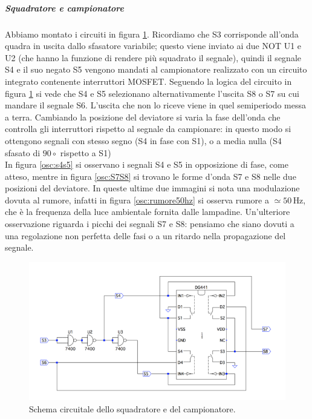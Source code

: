 \documentclass[10pt,a4paper]{article}
\begin{document}
\subparagraph{Squadratore e campionatore}
Abbiamo montato i circuiti in figura \ref{fig:sqadratore-campionatore}. Ricordiamo che S3 corrisponde all'onda quadra in uscita dallo sfasatore variabile; questo viene inviato ai due NOT U1 e U2 (che hanno la funzione di rendere più squadrato il segnale), quindi il segnale S4 e il suo negato S5 vengono mandati al campionatore realizzato con un circuito integrato contenente interruttori MOSFET. Seguendo la logica del circuito in figura \ref{fig:sqadratore-campionatore} si vede che S4 e S5 selezionano alternativamente l'uscita S8 o S7 su cui mandare il segnale S6. L'uscita che non lo riceve viene in quel semiperiodo messa a terra.
Cambiando la posizione del deviatore si varia la fase dell'onda che controlla gli interruttori rispetto al segnale da campionare: in questo modo si ottengono segnali con stesso segno (S4 in fase con S1), o a media nulla (S4 sfasato di $90\circ$ rispetto a S1)\\
In figura \ref{osc:s4s5} si osservano i segnali S4 e S5 in opposizione di fase, come atteso, mentre in figura \ref{osc:S7S8} si trovano le forme d'onda S7 e S8 nelle due posizioni del deviatore. In queste ultime due immagini si nota una modulazione dovuta al rumore, infatti in figura \ref{osc:rumore50hz} si osserva rumore a $\simeq 50\,\mbox{Hz}$, che è la frequenza della luce ambientale fornita dalle lampadine. %
Un'ulteriore osservazione riguarda i picchi dei segnali S7 e S8: pensiamo che siano dovuti a una regolazione non perfetta delle fasi o a un ritardo nella propagazione del segnale.

\begin{figure}[!htb]
  \centering
  \includegraphics[scale=0.75]{sqadratore-campionatore.png}
\caption{Schema circuitale dello squadratore e del campionatore.\label{fig:sqadratore-campionatore}}
\end{figure}
\end{document}
